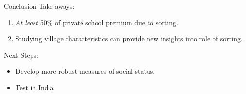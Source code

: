 \documentclass{beamer}
\begin{document}
\begin{frame}{Conclusion}
Take-aways:
	\begin{enumerate}
		\item \emph{At least} 50\% of private school premium due to sorting.
		\pause
		\item Studying village characteristics can provide new insights into role of sorting.
	\end{enumerate}
\pause
Next Steps:
\begin{itemize}
	\item Develop more robust measures of social status.
	\item Test in India
\end{itemize}

\end{frame}
\end{document}
